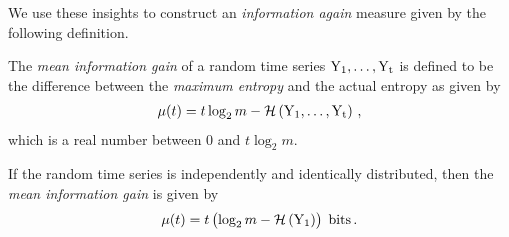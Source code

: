 \documentclass[ ../main.tex]{subfiles}
\begin{document}
We use these insights to construct an \emph{information again} measure given by the following definition.
\begin{definition}
The \emph{mean information gain} of a random time series $\rv{Y_1},\ldots,\rv{Y_t}$ is defined to be the difference between the \emph{maximum entropy} and the actual entropy as given by
\begin{align}
    \mu(t) = t \log_2 m - \entropy\left(\rv{Y_1},\ldots,\rv{Y_t}\right)\,,
\end{align}
which is a real number between $0$ and $t \log_2 m$.
\end{definition}
If the random time series is independently and identically distributed, then the \emph{mean information gain} is given by
\begin{align}
    \mu(t) = t \left(\log_2 m - \entropy\left(\rv{Y_1}\right)\right) \; \si{bits}\,.
\end{align}
\end{document}
